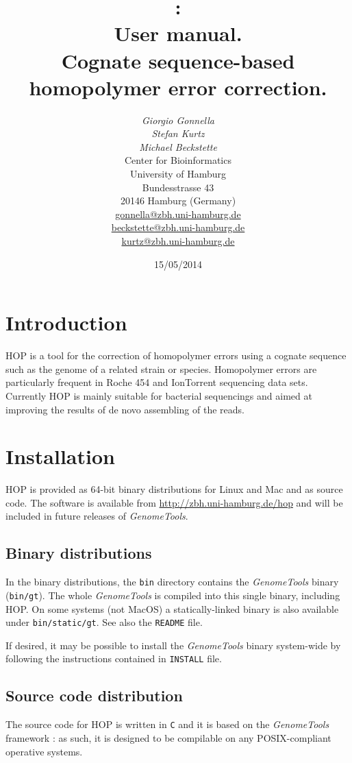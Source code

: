 \documentclass[12pt,titlepage]{article}
\title{\Huge{\Hop 1.0:\\ User manual.}\\[3mm]
\Large{Cognate sequence-based homopolymer error correction.}}
\author{\begin{tabular}{c}
         \textit{Giorgio Gonnella}\\
         \textit{Stefan Kurtz}\\
         \textit{Michael Beckstette}\\[2cm]
         Center for Bioinformatics\\
         University of Hamburg\\
         Bundesstrasse 43\\
         20146 Hamburg (Germany)\\[1cm]
         \url{gonnella@zbh.uni-hamburg.de}\\
         \url{beckstette@zbh.uni-hamburg.de}\\
         \url{kurtz@zbh.uni-hamburg.de}\\[1cm]
        \end{tabular}}
\date{15/05/2014}
\newcommand{\GenomeTools}{\textit{GenomeTools}\xspace}
\newcommand{\Hop}{{HOP}\xspace}
\begin{document}
\maketitle

\section{Introduction} \label{Introduction}

\Hop \cite{HOP} is a tool for the correction of homopolymer errors using a
cognate sequence such as the genome of a related strain or species.
Homopolymer errors are particularly frequent in
Roche 454 and IonTorrent sequencing data sets. Currently HOP is mainly
suitable for bacterial sequencings and aimed at improving the
results of de novo assembling of the reads.

\section{Installation}

\Hop is provided as 64-bit binary distributions for Linux and Mac and
as source code. The software is available from
\url{http://zbh.uni-hamburg.de/hop} and will be included in
future releases of \GenomeTools.

\subsection{Binary distributions}

In the binary distributions, the \texttt{bin} directory contains the
\GenomeTools binary (\texttt{bin/gt}). The whole \GenomeTools is compiled
into this single binary, including \Hop. On some systems (not MacOS)
a statically-linked binary is also available under \texttt{bin/static/gt}.
See also the \texttt{README} file.

If desired, it may be possible to install the
\GenomeTools binary system-wide by following the instructions contained
in \texttt{INSTALL} file.

\subsection{Source code distribution}

The source code for \Hop is written in \texttt{C} and it is based on
the \GenomeTools framework \cite{genometools}: as such, it is designed to
be compilable on any POSIX-compliant operative systems.
\end{document}
